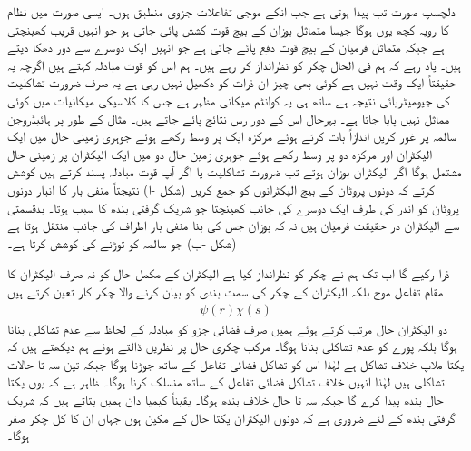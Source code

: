 دلچسپ صورت تب پیدا ہوتی ہے جب انکے موجی تفاعلات  جزوی منطبق ہوں۔ ایسی صورت میں نظام کا رویہ کچھ یوں ہوگا جیسا متماثل بوزان کے بیچ قوت کشش پائی جاتی ہو جو انہیں قریب کھینچتی ہے جبکہ متماثل فرمیان کے بیچ قوت دفع پائے جاتی ہے جو انہیں ایک دوسرے سے دور دھکا  دیتے ہیں۔ یاد رہے کہ ہم فی الحال چکر کو نظرانداز کر رہے ہیں۔ ہم اس کو قوت مبادلہ کہتے ہیں اگرچہ یہ حقیقتاً ایک وقت نہیں ہے کوئی بھی چیز ان ذرات کو دکھیل نہیں رہی ہے یہ صرف ضرورت تشاکلیت کی جیومیٹریائی نتیجہ ہے ساتھ ہی یہ کوانٹم میکانی مظہر ہے جس کا کلاسیکی میکانیات میں کوئی مماثل نہیں پایا جاتا ہے۔ بہرحال اس کے دور رس  نتائج پائے جاتے ہیں۔ مثال کے طور پر ہائیڈروجن سالمہ  پر غور کریں اندازاً بات کرتے ہوئے مرکزہ ایک پر وسط رکھے ہوئے جوہری زمینی حال  میں ایک الیکٹران اور مرکزہ دو پر وسط رکھے ہوئے جوہری زمین حال دو میں ایک الیکٹران پر زمینی حال مشتمل ہوگا اگر الیکٹران بوزان ہوتے تب ضرورت تشاکلیت یا اگر آپ قوت مبادلہ پسند کرتے ہیں کوشش کرتے کہ دونوں پروٹان کے بیچ الیکٹرانوں کو جمع کریں
 (شکل -ا)  نتیجتاً منفی بار کا انبار دونوں پروٹان کو اندر کی طرف ایک دوسرے کی جانب کھینچتا جو شریک گرفتی بندھ کا سبب ہوتا۔ بدقسمتی سے  الیکٹران  در حقیقت  فرمیان ہیں نہ کہ بوزان جس کی بنا منفی بار اطراف کی جانب منتقل ہوتا ہے   (شکل -ب)   جو سالمہ کو توڑنے کی کوشش کرتا ہے۔

ذرا رکیے گا اب تک ہم نے چکر کو نظرانداز کیا ہے الیکٹران کے مکمل حال کو نہ صرف الیکٹران کا مقام تفاعل موج بلکہ الیکٹران کے  چکر کی سمت بندی کو بیان کرنے والا چکر کار تعین کرتے ہیں
\begin{align}
	\psi(r)\chi(s)
\end{align}
دو الیکٹران حال مرتب کرتے  ہوئے ہمیں صرف فضائی جزو کو مبادلہ کے لحاظ سے عدم تشاکلی بنانا ہوگا بلکہ پورے کو عدم تشاکلی بنانا ہوگا۔ مرکب چکری حال  پر نظریں ڈالتے ہوئے ہم دیکھتے ہیں کہ یکتا ملاپ خلاف تشاکل ہے لہٰذا اس کو تشاکل فضائی تفاعل کے ساتھ جوڑنا ہوگا جبکہ تین سہ تا حالات تشاکلی ہیں لہٰذا انہیں خلاف تشاکل فضائی تفاعل کے ساتھ منسلک کرنا ہوگا۔ ظاہر ہے کہ یوں یکتا حال بندھ  پیدا کرے گا جبکہ سہ تا حال خلاف بندھ  ہوگا۔ یقیناً  کیمیا دان  ہمیں بتاتے ہیں کہ شریک گرفتی بندھ کے لئے ضروری ہے کہ دونوں الیکٹران یکتا حال کے مکین ہوں جہاں ان کا کل چکر صفر ہوگا۔


